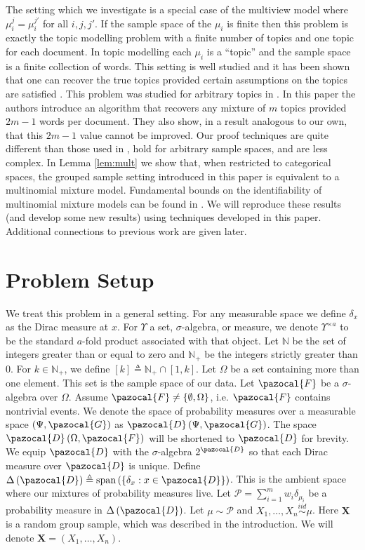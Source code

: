 \documentclass[aos,preprint]{imsart}
\def\nn{\mathbb{N}}
\def\l{\left}
\def\r{\right}
\def\sF{\pazocal{F}}
\def\sG{\pazocal{G}}
\def\sD{\pazocal{D}}
\def\sP{\mathscr{P}}
\def\bX{\mathbf{X}}
\def\dd{\Delta\left( \sD \right)}
\def\simiid{\overset{iid}{\sim}}
\def\spn{\operatorname{span}}
\theoremstyle{plain}
\theoremstyle{defintion}
\begin{document}
        The setting which we investigate is a special case of the multiview model where $\mu_i^j = \mu_i^{j'}$ for all $i,j,j'$. If the sample space of the $\mu_i$ is finite then this problem is exactly the topic modelling problem with a finite number of topics and one topic for each document. In topic modelling each $\mu_i$ is a ``topic'' and the sample space is a finite collection of words. This setting is well studied and it has been shown that one can recover the true topics provided certain assumptions on the topics are satisfied \cite{allman09, anandkumar14, arora12}. This problem was studied for arbitrary topics in \cite{rabani14}. In this paper the authors introduce an algorithm that recovers any mixture of $m$ topics provided $2m-1$ words per document. They also show, in a result analogous to our own, that this $2m-1$ value cannot be improved. Our proof techniques are quite different than those used in \cite{rabani14}, hold for arbitrary sample spaces, and are less complex. In Lemma \ref{lem:mult} we show that, when restricted to categorical spaces, the grouped sample setting introduced in this paper is equivalent to a multinomial mixture model. Fundamental bounds on the identifiability of multinomial mixture models can be found in \cite{kim1984,elmore2003}. We will reproduce these results (and develop some new results) using techniques developed in this paper. Additional connections to previous work are given later.
	\section{Problem Setup} \label{sec:problemsetup}
	We treat this problem in a general setting. For any measurable space we define $\delta_x$ as the Dirac measure at $x$. For $\Upsilon$ a set, $\sigma$-algebra, or measure, we denote $\Upsilon^{\times a}$ to be the standard $a$-fold product associated with that object. Let $\nn$ be the set of integers greater than or equal to zero and $\nn_+$ be the integers strictly greater than 0. For $k \in \nn_+$, we define $\left[ k \right] \triangleq \mathbb{N_+} \cap \left[ 1,k \right]$.
	Let $\Omega$ be a set containing more than one element. This set is the sample space of our data. Let $\sF$ be a $\sigma$-algebra over $\Omega$. Assume $\sF \neq \left\{ \emptyset, \Omega \right\}$, i.e. $\sF$ contains nontrivial events. We denote the space of probability measures over a measurable space $(\Psi, \sG)$ as $\sD\left( \Psi,\sG \right)$. The space $\sD\left( \Omega,\sF \right)$ will be shortened to $\sD$ for brevity. We equip $\sD$ with the $\sigma$-algebra $2^\sD$ so that each Dirac measure over $\sD$ is unique. Define $\dd \triangleq \spn \left( \l\{\delta_x: x \in \sD \r\}\right)$. This is the ambient space where our mixtures of probability measures live. Let $\sP = \sum_{i=1}^m  w_i \delta_{\mu_i}$ be a probability measure in $\dd$. Let $\mu\sim \sP$ and $X_1 ,\ldots, X_n \simiid \mu$. Here $\bX$ is a random group sample, which was described in the introduction. We will denote $\bX = \left( X_1,\ldots,X_n \right)$.
\end{document}
